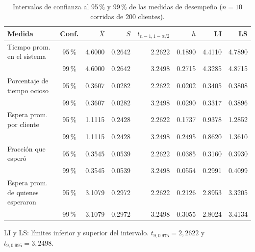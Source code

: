 \begin{table}[H]
\centering
\caption{Intervalos de confianza al 95\,\% y 99\,\% de las medidas de desempe\~no ($n=10$ corridas de 200 clientes).}
\label{tab:ci200}
\footnotesize
\begin{tabular}{@{}lcrrrrrr@{}}
\toprule
Medida & Conf. & $\bar{X}$ & $S$ & $t_{n-1,1-\alpha/2}$ & $h$ & LI & LS \\
\midrule
Tiempo prom. en el sistema & 95\,\% & 4.6000 & 0.2642 & 2.2622 & 0.1890 & 4.4110 & 4.7890 \\
 & 99\,\% & 4.6000 & 0.2642 & 3.2498 & 0.2715 & 4.3285 & 4.8715 \\
\addlinespace
Porcentaje de tiempo ocioso & 95\,\% & 0.3607 & 0.0282 & 2.2622 & 0.0202 & 0.3405 & 0.3808 \\
 & 99\,\% & 0.3607 & 0.0282 & 3.2498 & 0.0290 & 0.3317 & 0.3896 \\
\addlinespace
Espera prom. por cliente & 95\,\% & 1.1115 & 0.2428 & 2.2622 & 0.1737 & 0.9378 & 1.2852 \\
 & 99\,\% & 1.1115 & 0.2428 & 3.2498 & 0.2495 & 0.8620 & 1.3610 \\
\addlinespace
Fracci\'on que esper\'o & 95\,\% & 0.3545 & 0.0539 & 2.2622 & 0.0385 & 0.3160 & 0.3930 \\
 & 99\,\% & 0.3545 & 0.0539 & 3.2498 & 0.0554 & 0.2991 & 0.4099 \\
\addlinespace
Espera prom. de quienes esperaron & 95\,\% & 3.1079 & 0.2972 & 2.2622 & 0.2126 & 2.8953 & 3.3205 \\
 & 99\,\% & 3.1079 & 0.2972 & 3.2498 & 0.3055 & 2.8024 & 3.4134 \\
\bottomrule
\end{tabular}
\begin{minipage}{\textwidth}\vspace{2pt}\footnotesize
LI y LS: l\'imites inferior y superior del intervalo. $t_{9,0.975}=2{,}2622$ y $t_{9,0.995}=3{,}2498$.
\end{minipage}
\end{table}